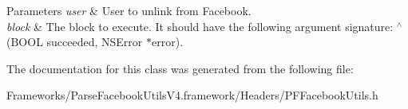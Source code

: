\begin{DoxyParams}{Parameters}
{\em user} & User to unlink from Facebook. \\
\hline
{\em block} & The block to execute. It should have the following argument signature\+: {\ttfamily $^\wedge$(B\+O\+O\+L succeeded, N\+S\+Error $\ast$error)}. \\
\hline
\end{DoxyParams}


The documentation for this class was generated from the following file\+:\begin{DoxyCompactItemize}
\item 
Frameworks/\+Parse\+Facebook\+Utils\+V4.\+framework/\+Headers/P\+F\+Facebook\+Utils.\+h\end{DoxyCompactItemize}

